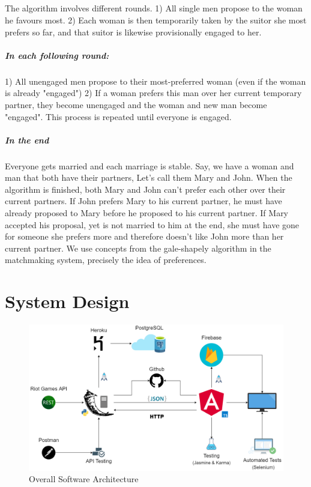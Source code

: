 \paragraph{}
The algorithm involves different rounds.
1) All single men propose to the woman he favours most. 2) Each woman is then temporarily taken by the suitor she most prefers so far, and that suitor is likewise provisionally engaged to her.
\paragraph{In each following round:}
1) All unengaged men propose to their most-preferred woman (even if the woman is already "engaged")
2) If a woman prefers this man over her current temporary partner, they become unengaged and the woman and new man become "engaged".
This process is repeated until everyone is engaged.

\paragraph{In the end}
Everyone gets married and each marriage is stable. \hfill \break
Say, we have a woman and man that both have their partners, Let's call them Mary and John.
When the algorithm is finished, both Mary and John can't prefer each other over their current partners. If John prefers Mary to his current partner, he must have already proposed to Mary before he proposed to his current partner. If Mary accepted his proposal, yet is not married to him at the end, she must have gone for someone she prefers more and therefore doesn't like John more than her current partner.\hfill
We use concepts from the gale-shapely algorithm in the matchmaking system, precisely the idea of preferences.

\chapter{System Design}

\begin{figure}[H]	  
	\includegraphics[width=\textwidth,height=\textheight,keepaspectratio]{img/Architecture.png}
	\caption{Overall Software Architecture}
	\label{tikz:arch}
\end{figure}

